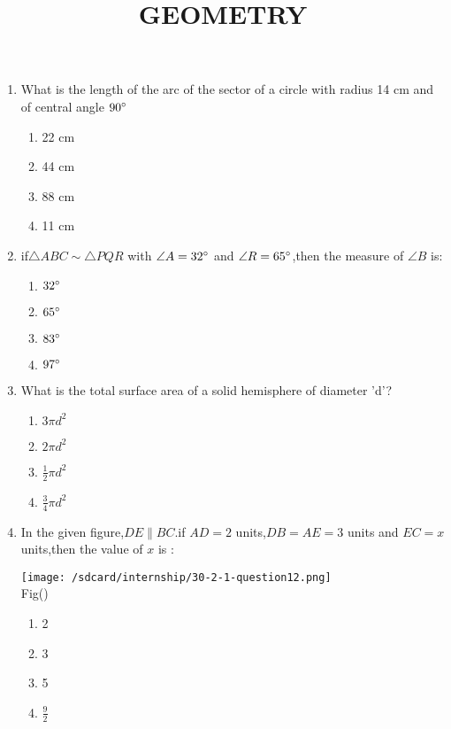 \documentclass{article}
\title{GEOMETRY}
\begin{document}
\maketitle
\begin{enumerate}
    \item What is the length of the arc of the sector of a circle with radius 14 cm and of central angle $90\degree$
    \begin{enumerate}
        \item 22 cm
        \item 44 cm
        \item 88 cm
        \item 11 cm
    \end{enumerate}
    \item if$\bigtriangleup ABC \sim \bigtriangleup PQR$ with $\angle A=32\degree$ and $\angle R=65\degree$,then the measure of $\angle B$ is:
    \begin{enumerate}
        \item $32\degree$
        \item $65\degree$
        \item $83\degree$
        \item $97\degree$
    \end{enumerate}
    \item What is the total surface area of a solid hemisphere of diameter 'd'?
    \begin{enumerate}
        \item $3 \pi d^2$
        \item $2 \pi d^2$
        \item $\frac{1}{2} \pi d^2$
        \item $\frac{3}{4} \pi d^2$
    \end{enumerate}
    \item In the given figure,$DE \parallel BC$.if $AD=2$ units,$DB=AE=3$ units and $EC=x$ units,then the value of $x$ is :
    \begin{center}
        \texttt{[image: /sdcard/internship/30-2-1-question12.png]}\\
        Fig()
    \end{center}
    \begin{enumerate}
        \item 2
        \item 3
        \item 5
        \item $\frac{9}{2}$
    \end{enumerate}

\end{enumerate}
\end{document}

